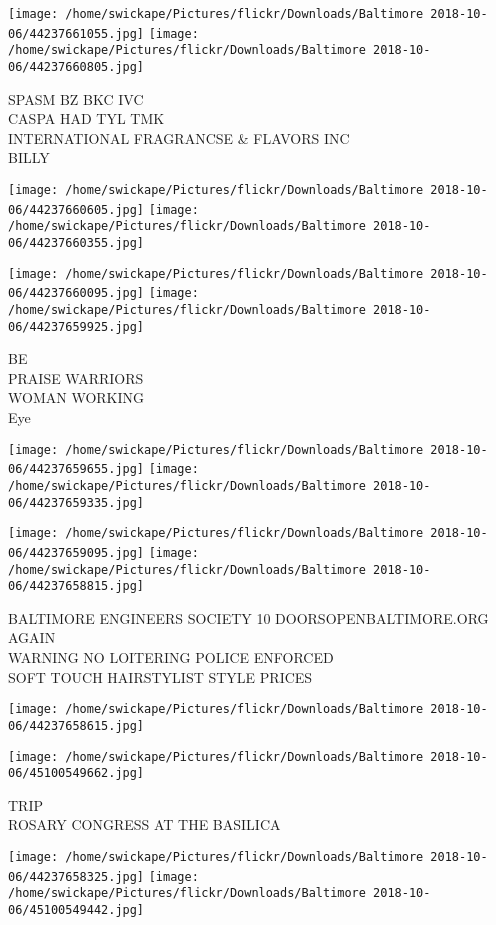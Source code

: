 \documentclass[10pt,letterpaper]{article}
\begin{document}
\texttt{[image: /home/swickape/Pictures/flickr/Downloads/Baltimore 2018-10-06/44237661055.jpg]}
\texttt{[image: /home/swickape/Pictures/flickr/Downloads/Baltimore 2018-10-06/44237660805.jpg]}

SPASM BZ BKC IVC\\
CASPA HAD TYL TMK\\
INTERNATIONAL FRAGRANCSE \& FLAVORS INC\\
BILLY
\pagebreak

\texttt{[image: /home/swickape/Pictures/flickr/Downloads/Baltimore 2018-10-06/44237660605.jpg]}
\texttt{[image: /home/swickape/Pictures/flickr/Downloads/Baltimore 2018-10-06/44237660355.jpg]}

\texttt{[image: /home/swickape/Pictures/flickr/Downloads/Baltimore 2018-10-06/44237660095.jpg]}
\texttt{[image: /home/swickape/Pictures/flickr/Downloads/Baltimore 2018-10-06/44237659925.jpg]}

BE\\
PRAISE WARRIORS\\
WOMAN WORKING\\
Eye
\pagebreak

\texttt{[image: /home/swickape/Pictures/flickr/Downloads/Baltimore 2018-10-06/44237659655.jpg]}
\texttt{[image: /home/swickape/Pictures/flickr/Downloads/Baltimore 2018-10-06/44237659335.jpg]}

\texttt{[image: /home/swickape/Pictures/flickr/Downloads/Baltimore 2018-10-06/44237659095.jpg]}
\texttt{[image: /home/swickape/Pictures/flickr/Downloads/Baltimore 2018-10-06/44237658815.jpg]}

BALTIMORE ENGINEERS SOCIETY 10 DOORSOPENBALTIMORE.ORG\\
AGAIN\\
WARNING NO LOITERING POLICE ENFORCED\\
SOFT TOUCH HAIRSTYLIST STYLE PRICES
\pagebreak

\texttt{[image: /home/swickape/Pictures/flickr/Downloads/Baltimore 2018-10-06/44237658615.jpg]}

\vspace{0.25in}
\texttt{[image: /home/swickape/Pictures/flickr/Downloads/Baltimore 2018-10-06/45100549662.jpg]}

TRIP\\
ROSARY CONGRESS AT THE BASILICA
\pagebreak

\texttt{[image: /home/swickape/Pictures/flickr/Downloads/Baltimore 2018-10-06/44237658325.jpg]}
\texttt{[image: /home/swickape/Pictures/flickr/Downloads/Baltimore 2018-10-06/45100549442.jpg]}
\end{document}
